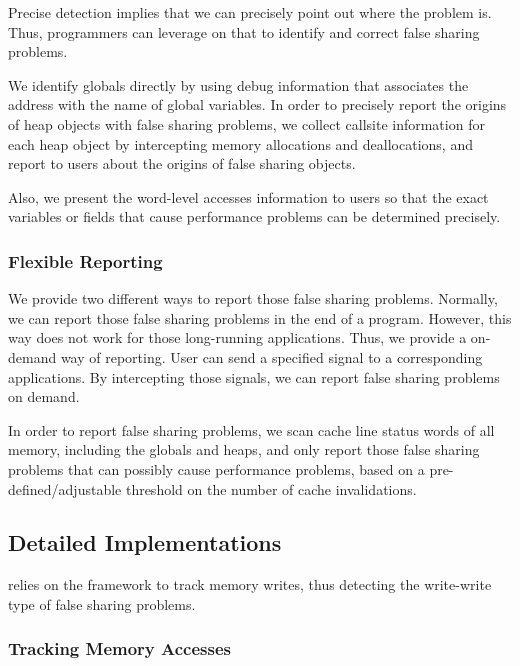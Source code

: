 Precise detection implies that we can precisely point out where the problem is. Thus, programmers can leverage on that to identify and correct false sharing problems. 

We identify globals directly by using debug information that associates the address with the name of global variables. In order to precisely report the origins of heap objects with false sharing problems, we collect callsite information for each heap object by intercepting memory allocations and deallocations, and report to users about the origins of false sharing objects. 

Also, we present the word-level accesses information to users so that the exact variables or fields that cause performance problems can be determined precisely. 

\subsubsection{Flexible Reporting}
\label{sec:flexiblereport}

We provide two different ways to report those false sharing problems. Normally, we can report those false sharing problems in the end of a program. However, this way does not work for those long-running applications. Thus, we provide a on-demand way of reporting. User can send a specified signal to a corresponding applications. By intercepting those signals, we can report false sharing problems on demand. 

In order to report false sharing problems, we scan cache line status words of all memory, including the globals and heaps,  and only report those false sharing problems that can possibly cause performance problems, based on a pre-defined/adjustable threshold on the number of cache invalidations.  

\subsection{Detailed Implementations}

\label{sec:sheriffdetect}
\SheriffDetect{} relies on the \sheriff{} framework to track memory writes, thus detecting the write-write type of false sharing problems.  

\subsubsection{Tracking Memory Accesses}
\label{sec:memoryaccesses}

